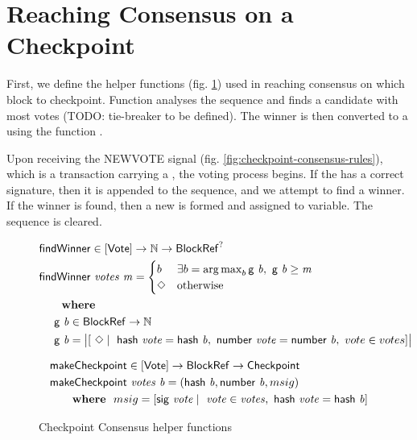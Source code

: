 \clearpage
\section{Reaching Consensus on a Checkpoint}

First, we define the helper functions (fig. \ref{fig:checkpoint-consensus-helpers}) used in reaching consensus on which block to checkpoint. Function  analyses the  sequence and finds a candidate with most votes (TODO: tie-breaker to be defined). The winner is then converted to a \Chkp using the function .

Upon receiving the NEWVOTE signal (fig. \ref{fig:checkpoint-consensus-rules}), which is a transaction carrying a , the voting process begins. If the  has a correct signature, then it is appended to the  sequence, and we attempt to find a winner. If the winner is found, then a new \Chkp is formed and assigned to  variable. The  sequence is cleared. 

\begin{figure}[tbh]
  \begin{align*}
    & \fun{findWinner} \in \Votes \to \N \to \BlockRef^?\\
    & \fun{findWinner}~\var{votes}~\var{m} =
      \begin{cases}
        b & \exists b = \argmax_b \fun{g}~\var{b},~ \fun{g}~\var{b} \geq \var{m}  \\
        \Nothing & \text{otherwise}
      \end{cases} \\
    & ~~~~\where \\
    & ~~~~\fun{g}~\var{b} \in \BlockRef \to \N \\
    & ~~~~\fun{g}~\var{b} = \big\lvert [~\Nothing \mid\ \fun{hash}~\var{vote} = \fun{hash}~\var{b},~ \fun{number}~\var{vote} = \fun{number}~\var{b},~ vote \in votes] \big\rvert
  \end{align*}

  \begin{align*}
    & \mathsf{makeCheckpoint} \in \mathsf{[Vote]} \to \mathsf{BlockRef} \to \mathsf{Checkpoint} \\
    & \mathsf{makeCheckpoint}~\mathit{votes}~\mathit{b} = (\mathsf{hash}~\mathit{b}, \mathsf{number}~\mathit{b}, msig) \\
    & ~~~~~ ~ \mathbf{where}~ ~  msig = [\mathsf{sig}~\mathit{vote} \mid\ \mathit{vote} \in \mathit{votes},~ \mathsf{hash}~\mathit{vote} = \mathsf{hash}~\mathit{b}]
  \end{align*}

  \caption{Checkpoint Consensus helper functions}
  \label{fig:checkpoint-consensus-helpers}
\end{figure}

